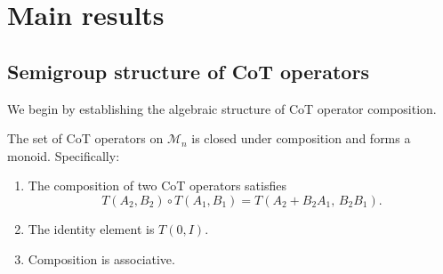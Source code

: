 \section{Main results}\label{sec:main}

\subsection{Semigroup structure of CoT operators}

We begin by establishing the algebraic structure of CoT operator composition.

\begin{theorem}\label{thm:semigroup}
  The set of CoT operators on $\mathcal{M}_n$ is closed under composition and
  forms a monoid. Specifically:
  \begin{enumerate}[label=\textup{(\alph*)}]
    \item The composition of two CoT operators satisfies
    \begin{equation}\label{eq:composition}
      T(A_2,B_2)\circ T(A_1,B_1) = T(A_2+B_2 A_1,\, B_2 B_1).
    \end{equation}
    \item The identity element is $T(0,I)$.
    \item Composition is associative.
  \end{enumerate}
\end{theorem}

